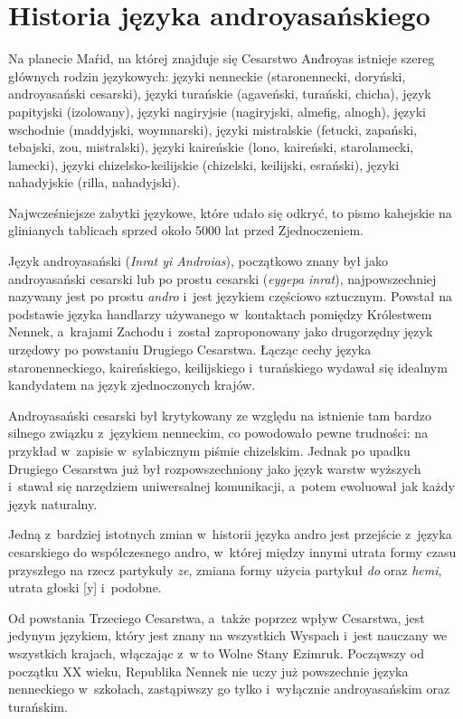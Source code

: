 \section[Historia]{Historia języka androyasańskiego}

\begin{spacing}{1.1}
Na planecie Maŕid, na której znajduje się Cesarstwo And́royas istnieje szereg 
głównych rodzin językowych: języki nenneckie (staronennecki, doryński, 
androyasański cesarski), języki turańskie (agaveński, turański, chicha), język 
papityjski (izolowany), języki nagiryjsie (nagiryjski, almefig, alnogh), 
języki wschodnie (maddyjski, woymnarski), języki mistralskie (fetucki, zapański, 
tebajski, zou, mistralski), języki kaireńskie (lono, kaireński, starolamecki, 
lamecki), języki chi\-zelsko-keilijskie (chizelski, keilijski, esrański), języki 
nahadyjskie (rilla, nahadyjski).

Najwcześniejsze zabytki językowe, które udało się odkryć, to pismo kahejskie na 
glinianych tablicach sprzed około 5000 lat przed Zjednoczeniem.

Język androyasański (\emph{Inrat yi Androias}), początkowo znany był jako 
androyasański cesarski lub po prostu cesarski (\emph{eygepa inrat}), 
najpowszechniej nazywany jest po prostu \emph{andro} i~jest językiem częściowo 
sztucznym. Powstał na podstawie języka handlarzy używanego w~kontaktach pomiędzy 
Królestwem Nennek, a~krajami Zachodu i~został zaproponowany jako drugorzędny 
język urzędowy po powstaniu Drugiego Cesarstwa. Łącząc cechy języka 
staronenneckiego, kaireńskiego, keilijskiego i~turańskiego wydawał się idealnym 
kandydatem na język zjednoczonych krajów.

Androyasański cesarski był krytykowany ze względu na istnienie tam bardzo 
silnego związku z~językiem nenneckim, co powodowało pewne trudności: na przykład 
w~zapisie w~sylabicznym piśmie chizelskim. Jednak po upadku Drugiego Cesarstwa 
już był rozpowszechniony jako język warstw wyższych i~stawał się narzędziem 
uniwersalnej komunikacji, a~potem ewoluował jak każdy język naturalny.

Jedną z~bardziej istotnych zmian w~historii języka andro jest przejście z~języka
cesarskiego do współczesnego andro, w~której między innymi utrata formy czasu
przyszłego na rzecz partykuły \emph{ze}, zmiana formy użycia partykuł \emph{do}
oraz \emph{hemi}, utrata głoski [y] i~podobne.

Od powstania Trzeciego Cesarstwa, a~także poprzez wpływ Cesarstwa, jest jedynym 
językiem, który jest znany na wszystkich Wyspach i~jest nauczany we wszystkich 
krajach, włączając z~w to Wolne Stany Ezimruk. Począwszy od początku XX wieku, 
Republika Nennek nie uczy już powszechnie języka nenneckiego w~szkołach, 
zastąpiwszy go tylko i~wyłącznie androyasańskim oraz turańskim.


\end{spacing}

